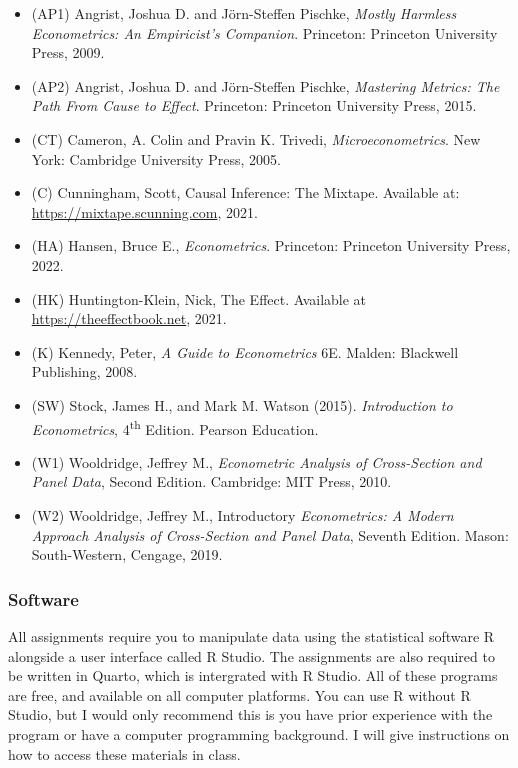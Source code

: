 \documentclass[
  letterpaper,
  DIV=11,
  numbers=noendperiod]{scrartcl}
\begin{document}
\begin{itemize}
\item
  (AP1) Angrist, Joshua D. and Jörn-Steffen Pischke, \emph{Mostly
  Harmless Econometrics: An Empiricist's Companion}. Princeton:
  Princeton University Press, 2009.
\item
  (AP2) Angrist, Joshua D. and Jörn-Steffen Pischke, \emph{Mastering
  Metrics: The Path From Cause to Effect}. Princeton: Princeton
  University Press, 2015.
\item
  (CT) Cameron, A. Colin and Pravin K. Trivedi,
  \emph{Microeconometrics}. New York: Cambridge University Press, 2005.
\item
  (C) Cunningham, Scott, Causal Inference: The Mixtape. Available at:
  \url{https://mixtape.scunning.com}, 2021.
\item
  (HA) Hansen, Bruce E., \emph{Econometrics}. Princeton: Princeton
  University Press, 2022.
\item
  (HK) Huntington-Klein, Nick, The Effect. Available at
  \url{https://theeffectbook.net}, 2021.
\item
  (K) Kennedy, Peter, \emph{A Guide to Econometrics} 6E. Malden:
  Blackwell Publishing, 2008.
\item
  (SW) Stock, James H., and Mark M. Watson (2015). \emph{Introduction to
  Econometrics}, 4\textsuperscript{th} Edition. Pearson Education.
\item
  (W1) Wooldridge, Jeffrey M., \emph{Econometric Analysis of
  Cross-Section and Panel Data}, Second Edition. Cambridge: MIT Press,
  2010.
\item
  (W2) Wooldridge, Jeffrey M., Introductory \emph{Econometrics: A Modern
  Approach Analysis of Cross-Section and Panel Data}, Seventh Edition.
  Mason: South-Western, Cengage, 2019.
\end{itemize}

\hypertarget{software}{%
\subsubsection{Software}\label{software}}

All assignments require you to manipulate data using the statistical
software R alongside a user interface called R Studio. The assignments
are also required to be written in Quarto, which is intergrated with R
Studio. All of these programs are free, and available on all computer
platforms. You can use R without R Studio, but I would only recommend
this is you have prior experience with the program or have a computer
programming background. I will give instructions on how to access these
materials in class.
\end{document}
